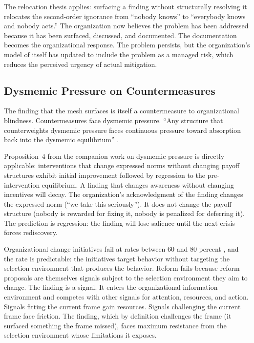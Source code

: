 \documentclass[11pt,a4paper]{article}
\begin{document}
The relocation thesis applies: surfacing a finding without structurally resolving it relocates the second-order ignorance from ``nobody knows'' to ``everybody knows and nobody acts.'' The organization now believes the problem has been addressed because it has been surfaced, discussed, and documented. The documentation becomes the organizational response. The problem persists, but the organization's model of itself has updated to include the problem as a managed risk, which reduces the perceived urgency of actual mitigation.


\subsection{Dysmemic Pressure on Countermeasures}
\label{sec:countermeasure-decay}

The finding that the mesh surfaces is itself a countermeasure to organizational blindness. Countermeasures face dysmemic pressure. ``Any structure that counterweights dysmemic pressure faces continuous pressure toward absorption back into the dysmemic equilibrium'' \citep{mcentire2025a}.

Proposition~4 from the companion work on dysmemic pressure is directly applicable: interventions that change expressed norms without changing payoff structures exhibit initial improvement followed by regression to the pre-intervention equilibrium. A finding that changes awareness without changing incentives will decay. The organization's acknowledgment of the finding changes the expressed norm (``we take this seriously''). It does not change the payoff structure (nobody is rewarded for fixing it, nobody is penalized for deferring it). The prediction is regression: the finding will lose salience until the next crisis forces rediscovery.

Organizational change initiatives fail at rates between 60 and 80 percent \citep{beer2000}, and the rate is predictable: the initiatives target behavior without targeting the selection environment that produces the behavior. Reform fails because reform proposals are themselves signals subject to the selection environment they aim to change. The finding is a signal. It enters the organizational information environment and competes with other signals for attention, resources, and action. Signals fitting the current frame gain resources. Signals challenging the current frame face friction. The finding, which by definition challenges the frame (it surfaced something the frame missed), faces maximum resistance from the selection environment whose limitations it exposes.
\end{document}
